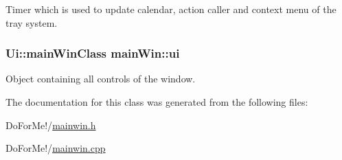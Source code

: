 Timer which is used to update calendar, action caller and context menu of the tray system. 

\hypertarget{classmain_win_a89fa9d3006573378f3195845fe9ed408}{
\subsubsection[{ui}]{\setlength{\rightskip}{0pt plus 5cm}Ui\-::main\-Win\-Class main\-Win\-::ui\hspace{0.3cm}{\ttfamily [private]}}}\label{classmain_win_a89fa9d3006573378f3195845fe9ed408}


Object containing all controls of the window. 



The documentation for this class was generated from the following files\-:\begin{DoxyCompactItemize}
\item 
Do\-For\-Me!/\hyperlink{mainwin_8h}{mainwin.\-h}\item 
Do\-For\-Me!/\hyperlink{mainwin_8cpp}{mainwin.\-cpp}\end{DoxyCompactItemize}

